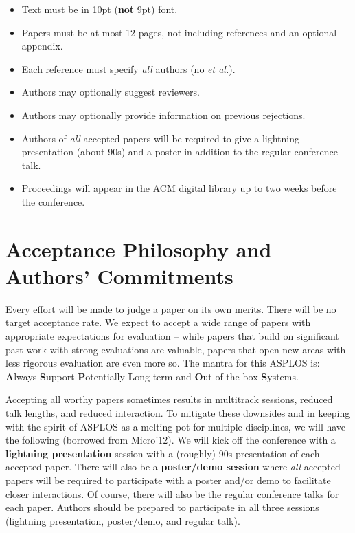 \documentclass[pageno]{jpaper}
\begin{document}
\begin{itemize} 
\item Text must be in 10pt ({\bf not} 9pt) font.
\item Papers must be at most 12 pages, not including references and an
optional appendix. 
\item Each reference must specify {\em all} authors (no {\em et al.}).
\item Authors may optionally suggest reviewers. 
\item Authors may optionally provide information on previous rejections.
\item Authors of {\em all} accepted papers will be required to give a
lightning presentation (about 90s) and a poster in addition to the regular
conference talk.
\item Proceedings will appear in the ACM digital library up to two weeks
before the conference.
\end{itemize} 

\section{Acceptance Philosophy and Authors' Commitments}

Every effort will be made to judge a paper on its own merits. There will be
no target acceptance rate. We expect to accept a wide range of papers with
appropriate expectations for evaluation -- while papers that build on
significant past work with strong evaluations are valuable, papers that
open new areas with less rigorous evaluation are even more so.  The mantra
for this ASPLOS is: {\bf A}lways {\bf S}upport {\bf P}otentially {\bf
L}ong-term and {\bf O}ut-of-the-box {\bf S}ystems.

Accepting all worthy papers sometimes results in multitrack sessions,
reduced talk lengths, and reduced interaction. To mitigate these downsides
and in keeping with the spirit of ASPLOS as a melting pot for multiple
disciplines, we will have the following (borrowed from Micro'12).  We will
kick off the conference with a {\bf lightning presentation} session with a
(roughly) 90s presentation of each accepted paper. There will also be a {\bf
poster/demo session} where {\em all} accepted papers will be required to
participate with a poster and/or demo to facilitate closer interactions. Of
course, there will also be the regular conference talks for each paper.
Authors should be prepared to participate in all three sessions (lightning
presentation, poster/demo, and regular talk).
\end{document}
